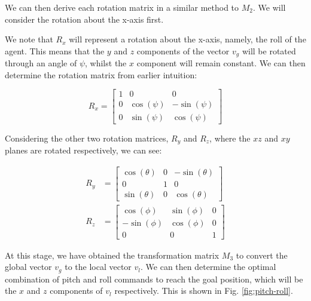 \documentclass[12pt]{article}
\begin{document}
We can then derive each rotation matrix in a similar method to $M_2$. We will consider the rotation about the x-axis first.

We note that $R_x$ will represent a rotation about the x-axis, namely, the roll of the agent. This means that the $y$ and $z$ components of the vector $v_g$ will be rotated through an angle of $\psi$, whilst the $x$ component will remain constant. We can then determine the rotation matrix from earlier intuition:

\begin{equation}
    R_x =
    \begin{bmatrix}
        1 & 0 & 0 \\
        0 & \cos(\psi) & -\sin(\psi) \\
        0 & \sin(\psi) & \cos(\psi)
    \end{bmatrix}
\end{equation}

Considering the other two rotation matrices, $R_y$ and $R_z$, where the $xz$ and $xy$ planes are rotated respectively, we can see:

\begin{equation}
    \begin{aligned}
        R_y &=
        \begin{bmatrix}
        \cos(\theta) & 0 & -\sin(\theta) \\
        0 & 1 & 0 \\
        \sin(\theta) & 0 & \cos(\theta)
        \end{bmatrix}
        \\
        R_z &=
        \begin{bmatrix}
        \cos(\phi) & \sin(\phi) & 0 \\
        -\sin(\phi) & \cos(\phi) & 0 \\
        0 & 0 & 1
        \end{bmatrix} 
    \end{aligned}
\end{equation}

At this stage, we have obtained the transformation matrix $M_3$ to convert the global vector $v_g$ to the local vector $v_l$. We can then determine the optimal combination of pitch and roll commands to reach the goal position, which will be the $x$ and $z$ components of $v_l$ respectively. This is shown in Fig. \ref{fig:pitch-roll}.
\end{document}
